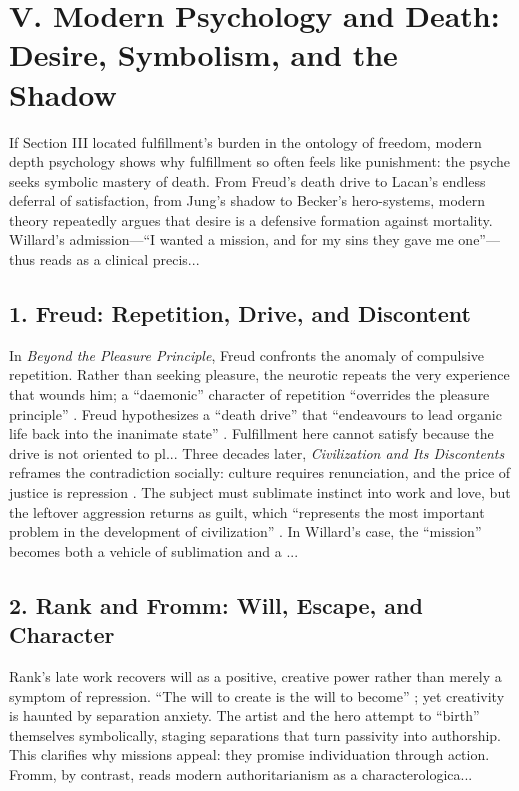 \section*{V. Modern Psychology and Death: Desire, Symbolism, and the Shadow}
\label{sec:v-modern-psychology-and-death-desire-symbolism-and-the-shadow}

If Section III located fulfillment’s burden in the ontology of freedom, modern depth psychology shows why fulfillment so often feels like punishment: the psyche seeks symbolic mastery of death. From Freud’s death drive to Lacan’s endless deferral of satisfaction, from Jung’s shadow to Becker’s hero-systems, modern theory repeatedly argues that desire is a defensive formation against mortality. Willard’s admission---``I wanted a mission, and for my sins they gave me one''---thus reads as a clinical precis...
\subsection*{1. Freud: Repetition, Drive, and Discontent}
\label{ssec:1-freud-repetition-drive-and-discontent}
In \textit{Beyond the Pleasure Principle}, Freud confronts the anomaly of compulsive repetition. Rather than seeking pleasure, the neurotic repeats the very experience that wounds him; a ``daemonic'' character of repetition ``overrides the pleasure principle'' \parencite[p.~22]{FreudBeyond1955}. Freud hypothesizes a ``death drive'' that ``endeavours to lead organic life back into the inanimate state'' \parencite[p.~38]{FreudBeyond1955}. Fulfillment here cannot satisfy because the drive is not oriented to pl...
Three decades later, \textit{Civilization and Its Discontents} reframes the contradiction socially: culture requires renunciation, and the price of justice is repression \parencite{FreudCivilization1961}. The subject must sublimate instinct into work and love, but the leftover aggression returns as guilt, which ``represents the most important problem in the development of civilization'' \parencite[p.~97]{FreudCivilization1961}. In Willard’s case, the ``mission'' becomes both a vehicle of sublimation and a ...
\subsection*{2. Rank and Fromm: Will, Escape, and Character}
\label{ssec:2-rank-and-fromm-will-escape-and-character}
Rank’s late work recovers will as a positive, creative power rather than merely a symptom of repression. ``The will to create is the will to become'' \parencite[p.~xx]{RankWill1978}; yet creativity is haunted by separation anxiety. The artist and the hero attempt to ``birth'' themselves symbolically, staging separations that turn passivity into authorship. This clarifies why missions appeal: they promise individuation through action. Fromm, by contrast, reads modern authoritarianism as a characterologica...
